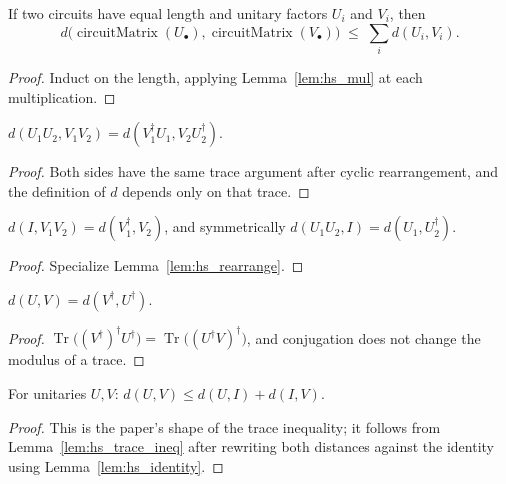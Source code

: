 \begin{lemma}
  \label{lem:hs_circuit_sum}
  \leanok
  If two circuits have equal length and unitary factors $U_i$ and $V_i$, then
  \[
    d\big(\operatorname{circuitMatrix}(U_\bullet),
          \operatorname{circuitMatrix}(V_\bullet)\big)
      \;\le\; \sum_i d(U_i, V_i).
  \]
\end{lemma}

\begin{proof}
  \leanok
  Induct on the length, applying Lemma~\ref{lem:hs_mul} at each
  multiplication.
\end{proof}

\begin{lemma}
  \label{lem:hs_rearrange}
  \leanok
  $d(U_1 U_2, V_1 V_2) = d(V_1^\dagger U_1, V_2 U_2^\dagger)$.
\end{lemma}

\begin{proof}
  \leanok
  Both sides have the same trace argument after cyclic rearrangement, and the
  definition of $d$ depends only on that trace.
\end{proof}

\begin{lemma}
  \label{lem:hs_identity}
  \leanok
  $d(I, V_1 V_2) = d(V_1^\dagger, V_2)$, and symmetrically
  $d(U_1 U_2, I) = d(U_1, U_2^\dagger)$.
\end{lemma}

\begin{proof}
  \leanok
  Specialize Lemma~\ref{lem:hs_rearrange}.
\end{proof}

\begin{lemma}
  \label{lem:hs_dagger}
  \leanok
  $d(U,V) = d(V^\dagger, U^\dagger)$.
\end{lemma}

\begin{proof}
  \leanok
  $\operatorname{Tr}\!\big((V^\dagger)^\dagger U^\dagger\big)
    = \operatorname{Tr}\!\big((U^\dagger V)^\dagger\big)$, and conjugation does
  not change the modulus of a trace.
\end{proof}

\begin{lemma}
  \label{lem:hs_triangle_one}
  \leanok
  For unitaries $U, V$: $d(U,V) \le d(U,I) + d(I,V)$.
\end{lemma}

\begin{proof}
  \leanok
  This is the paper's shape of the trace inequality; it follows from
  Lemma~\ref{lem:hs_trace_ineq} after rewriting both distances against the
  identity using Lemma~\ref{lem:hs_identity}.
\end{proof}
